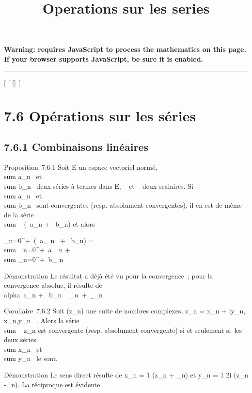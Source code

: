 \documentclass[]{article}
\title{Operations sur les series}
\author{}
\date{}
\begin{document}
\maketitle

\textbf{Warning: 
requires JavaScript to process the mathematics on this page.\\ If your
browser supports JavaScript, be sure it is enabled.}

\begin{center}\rule{3in}{0.4pt}\end{center}

[
[
[]
[

\section{7.6 Opérations sur les séries}

\subsection{7.6.1 Combinaisons linéaires}

Proposition~7.6.1 Soit E un espace vectoriel normé,
\\sum  a_n~ et
\\sum  b_n~ deux
séries à termes dans E, \alpha~ et \beta~ deux scalaires. Si
\\sum  a_n~ et
\\sum  b_n~ sont
convergentes (resp. absolument convergentes), il en est de même de la
série \\sum ~
(\alpha~a_n + \beta~b_n) et alors

\sum _n=0^+\infty~(\alpha~a_ n~ +
\beta~b_n) = \alpha~\\sum
_n=0^+\infty~a_ n + \beta~\\sum
_n=0^+\infty~b_ n

Démonstration Le résultat a déjà été vu pour la convergence~; pour la
convergence absolue, il résulte de
\\alpha~a_n +
\beta~b_n\
\leq\alpha~\,\a_n\
+
\beta~\,\b_n\

Corollaire~7.6.2 Soit (z_n) une suite de nombres complexes,
z_n = x_n + iy_n, x_n,y_n \in
\mathbb{R}~. Alors la série \\sum ~
z_n est convergente (resp. absolument convergente) si et
seulement si~les deux séries
\\sum  x_n~ et
\\sum  y_n~ le
sont.

Démonstration Le sens direct résulte de x_n = 1
 (z_n +
\overlinez_n) et y_n = 1
\over 2i (z_n
-\overlinez_n). La réciproque est évidente.
\end{document}
